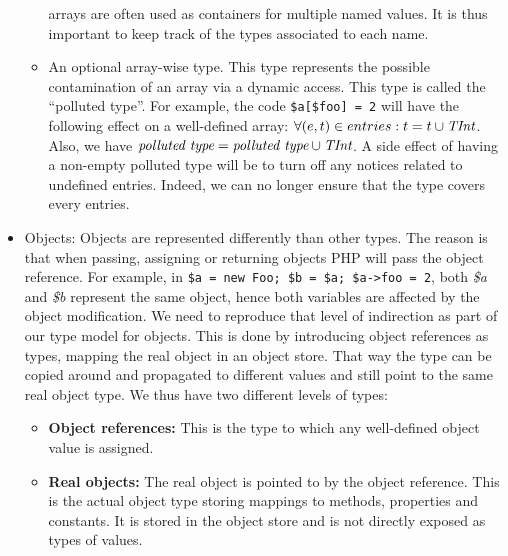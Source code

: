 \documentclass[a4paper]{article}
\begin{document}
\begin{itemize}
\begin{itemize}
          arrays are often used as containers for multiple named values. It is
          thus important to keep track of the types associated to each name.
        \item An optional array-wise type. This type represents the possible 
          contamination of an array via a dynamic access. This type is called
          the ``polluted type''. For example, the code
          \verb/$a[$foo] = 2/ will have the following effect on a well-defined
          array: $\forall (e, t) \in entries: t = t \cup \emph{TInt}$. Also, we
          have $\emph{polluted type} = \emph{polluted type} \cup \emph{TInt}$.
          A side effect of having a non-empty polluted type will be to turn off
          any notices related to undefined entries. Indeed, we can no longer
          ensure that the type covers every entries.
    \end{itemize}
  \item Objects: Objects are represented differently than other types. The
    reason is that when passing, assigning or returning objects PHP will pass
    the object reference. For example, in 
    \verb/$a = new Foo; $b = $a; $a->foo = 2/, both \emph{\$a} and \emph{\$b}
    represent the same object, hence both variables are affected by the object
    modification. We need to reproduce that level of indirection as part of our
    type model for objects. This is done by introducing object references as
    types, mapping the real object in an object store. That way the type can
    be copied around and propagated to different values and still point to the
    same real object type. We thus have two different levels of types:
    \begin{itemize}
          \item \textbf{Object references:} This is the type to which
            any well-defined object value is assigned.
          \item \textbf{Real objects:} The real object is pointed to by the
            object reference. This is the actual object type storing mappings to
            methods, properties and constants. It is stored in the object store
            and is not directly exposed as types of values.
    \end{itemize}


\end{itemize}
\end{document}
